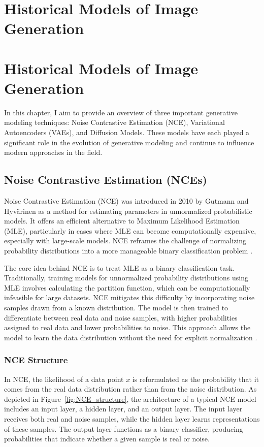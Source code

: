\chapter{Historical Models of Image Generation}

\chapter{Historical Models of Image Generation}

In this chapter, I aim to provide an overview of three important generative modeling techniques: Noise Contrastive Estimation (NCE), Variational Autoencoders (VAEs), and Diffusion Models. These models have each played a significant role in the evolution of generative modeling and continue to influence modern approaches in the field. 

\section{Noise Contrastive Estimation (NCEs)}

Noise Contrastive Estimation (NCE) was introduced in 2010 by Gutmann and Hyvärinen as a method for estimating parameters in unnormalized probabilistic models. It offers an efficient alternative to Maximum Likelihood Estimation (MLE), particularly in cases where MLE can become computationally expensive, especially with large-scale models. NCE reframes the challenge of normalizing probability distributions into a more manageable binary classification problem \citep{10.48550/arxiv.1711.00658}. 

The core idea behind NCE is to treat MLE as a binary classification task. Traditionally, training models for unnormalized probability distributions using MLE involves calculating the partition function, which can be computationally infeasible for large datasets. NCE mitigates this difficulty by incorporating noise samples drawn from a known distribution. The model is then trained to differentiate between real data and noise samples, with higher probabilities assigned to real data and lower probabilities to noise. This approach allows the model to learn the data distribution without the need for explicit normalization \citep{10.48550/arxiv.2110.11271}.

\subsection{NCE Structure}
In NCE, the likelihood of a data point \( x \) is reformulated as the probability that it comes from the real data distribution rather than from the noise distribution. As depicted in Figure~\ref{fig:NCE_structure}, the architecture of a typical NCE model includes an input layer, a hidden layer, and an output layer. The input layer receives both real and noise samples, while the hidden layer learns representations of these samples. The output layer functions as a binary classifier, producing probabilities that indicate whether a given sample is real or noise.

